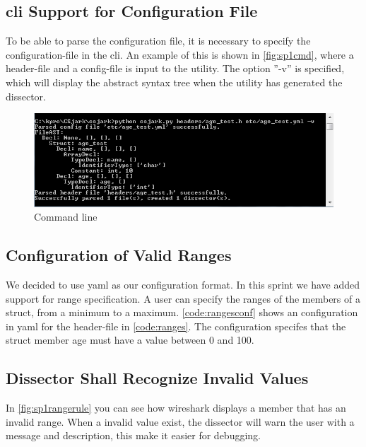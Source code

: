 \subsection{\gls{cli} Support for Configuration File}
To be able to parse the configuration file, it is necessary to specify the 
configuration-file in the \gls{cli}. An example of this is shown in 
\autoref{fig:sp1cmd}, where a \gls{header}-file and a config-file is input to the 
\gls{utility}. The option ''-v'' is specified, which will display the abstract 
syntax tree when the \gls{utility} has generated the \gls{dissector}.

\begin{figure}[ht]
	\includegraphics[width=\textwidth]{./sprints/img/cmd_agetest_run}
	\caption{Command line\label{fig:sp1cmd}}
\end{figure}

\subsection{Configuration of Valid Ranges}
We decided to use \gls{yaml} as our configuration format. In this sprint we have
added support for range specification. A user can specify the ranges of the
\glspl{member} of a \gls{struct}, from a minimum to a maximum. \autoref{code:rangesconf} 
shows an configuration in \gls{yaml} for the \gls{header}-file in \autoref{code:ranges}. 
The configuration specifes that the \gls{struct} \gls{member} age must have a value 
between 0 and 100.  





\subsection{Dissector Shall Recognize Invalid Values}
In \autoref{fig:sp1rangerule} you can see how \Gls{wireshark} displays a \gls{member} that 
has an invalid range. When a invalid value exist, the \gls{dissector} will warn the 
user with a message and description, this make it easier for debugging.

